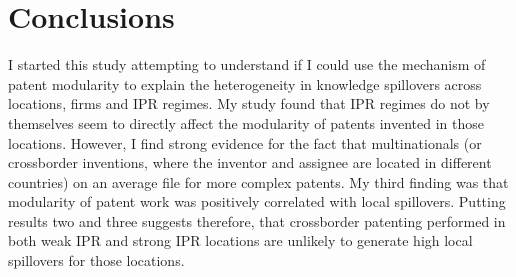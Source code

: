\documentclass[12pt]{article}
\begin{document}
\section{Conclusions}
I started this study attempting to understand if I could use the mechanism of patent modularity to explain the heterogeneity in knowledge spillovers across locations, firms and IPR regimes. My study found that IPR regimes do not by themselves seem to directly affect the modularity of patents invented in those locations. However, I find strong evidence for the fact that multinationals (or crossborder inventions, where the inventor and assignee are located in different countries) on an average file for more complex patents. My third finding was that modularity of patent work was positively correlated with local spillovers. Putting results two and three suggests therefore, that crossborder patenting performed in both weak IPR and strong IPR locations are unlikely to generate high local spillovers for those locations. 

\singlespacing
 



\appendix
\end{document}
